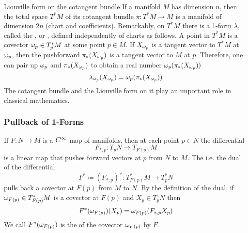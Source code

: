 \begin{example}{Liouville form on the cotangent bundle}{}
    If a manifold \(M\) has dimension \(n\), then the total space \(T^* M\) of its cotangent bundle \(\pi \colon T^* M \rightarrow M\) is a manifold of dimension \(2n\) (chart and coefficients). 
    Remarkably, on \(T^* M\) there is a 1-form \(\lambda\), called the , or , defined independently of charts as follows.
    A point in \(T^* M\) is a covector \(\omega_p \in T_p^* M\) at some point \(p \in M\).
    If \(X_{\omega_p}\) is a tangent vector to \(T^* M\) at \(\omega_p\), then the pushforward \(\pi_* (X_{\omega_p})\) is a tangent vector to \(M\) at \(p\).
    Therefore, one can pair up \(\omega_p\) and \(\pi_* (X_{\omega_p})\) to obtain a real number \(\omega_p (\pi_* (X_{\omega_p}))\)
    \[
        \lambda_{\omega_p} (X_{\omega_p}) = \omega_p (\pi_* (X_{\omega_p}))
    \]
    The cotangent bundle and the Liouville form on it play an important role in classical mathematics.
\end{example}

\subsubsection{Pullback of 1-Forms}

If \(F \colon N \rightarrow M\) is a \(C^\infty\) map of manifolds, then at each point \(p \in N\) the differential
\[
    F_{*,p} \colon T_p N \rightarrow T_{F(p)} M
\]
is a linear map that pushes forward vectors at \(p\) from \(N\) to \(M\).
The  i.e. the dual of the differential
\[
    F^* \coloneqq (F_{*,p})^\vee \colon T_{F(p)}^* M \rightarrow T_p^* N   
\]
pulls back a covector at \(F(p)\) from \(M\) to \(N\).
By the definition of the dual, if \(\omega_{F(p)} \in T_{F(p)}^* M\) is a covector at \(F(p)\) and \(X_p \in T_p N\) then 
\[
    F^* (\omega_{F(p)}) (X_p) = \omega_{F(p)} (F_{*,p} X_p)  
\]
We call \(F^* (\omega_{F(p)})\) is the  of the covector \(\omega_{F(p)}\) by \(F\).


